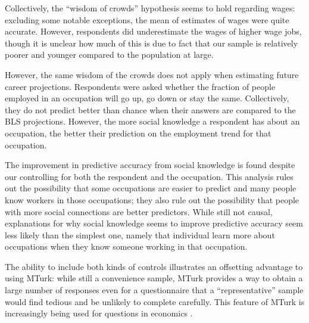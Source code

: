 \documentclass[12pt]{article}
\begin{document}
Collectively, the ``wisdom of crowds'' hypothesis seems to hold regarding wages: 
excluding some notable exceptions, the mean of estimates of wages were quite accurate. 
However, respondents did underestimate the wages of higher wage jobs,
though it is unclear how much of this is due to fact that our sample is relatively poorer and younger compared to the population at large. 


However, the same wisdom of the crowds does not apply when estimating future career projections.
Respondents were asked whether the fraction of people employed in an occupation will go up, go down or stay the same. 
Collectively, they do not predict better than chance when their answers are compared to the BLS projections. 
However, the more social knowledge a respondent has about an occupation, the better their prediction on the employment trend for that occupation. %

The improvement in predictive accuracy from social knowledge is found despite our controlling for both the respondent and the occupation.
This analysis rules out the possibility that some occupations are easier to predict and many people know workers in those occupations; 
they also rule out the possibility that people with more social connections are better predictors.
While still not causal, explanations for why social
knowledge seems to improve predictive accuracy seem less likely than the simplest one, namely that individual learn more about occupations when they know someone working in that occupation. 


The ability to include both kinds of controls illustrates an offsetting advantage to using MTurk: 
while still a convenience sample, MTurk provides a way to obtain a large number of responses even for a questionnaire that a ``representative'' sample would find tedious and be unlikely to complete carefully.
This feature of MTurk is increasingly being used for questions in economics  \citep{kuziemko2013elastic, saez2013generalized}. 
\end{document}
